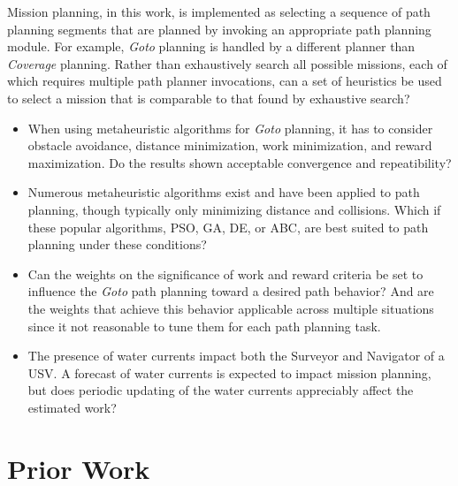 \documentclass{tamuccthesis}
\begin{document}
Mission planning, in this work, is implemented as selecting a sequence of path planning segments that are planned by invoking an appropriate path planning module. For example, \textit{Goto} planning is handled by a different planner than \textit{Coverage} planning. Rather than exhaustively search all possible missions, each of which requires multiple path planner invocations, can a set of heuristics be used to select a mission that is comparable to that found by exhaustive search?

\begin{itemize}
    \item When using metaheuristic algorithms for \textit{Goto} planning, it has to consider obstacle avoidance, distance minimization, work minimization, and reward maximization. Do the results shown acceptable convergence and repeatibility?

    \item Numerous metaheuristic algorithms exist and have been applied to path planning, though typically only minimizing distance and collisions. Which if these popular algorithms, PSO, GA, DE, or ABC, are best suited to path planning under these conditions?

    \item Can the weights on the significance of work and reward criteria be set to influence the \textit{Goto} path planning toward a desired path behavior? And are the weights that achieve this behavior applicable across multiple situations since it not reasonable to tune them for each path planning task. 

    \item The presence of water currents impact both the Surveyor and Navigator of a USV. A forecast of water currents is expected to impact mission planning, but does periodic updating of the water currents appreciably affect the estimated work? 
\end{itemize}

\section{Prior Work}
\end{document}
